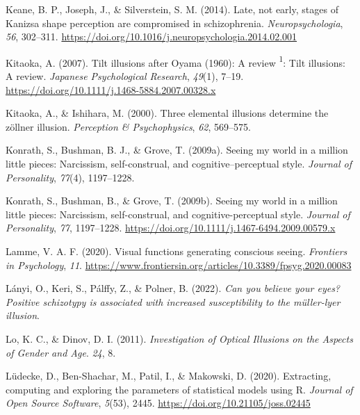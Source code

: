 \documentclass[
  man,floatsintext]{apa6}
\newlength{\cslhangindent}
\newlength{\cslentryspacingunit} %
\newenvironment{CSLReferences}[2] %
 {%
  \setlength{\parindent}{0pt}
  \ifodd #1
  \let\oldpar\par
  \def\par{\hangindent=\cslhangindent\oldpar}
  \fi
  \setlength{\parskip}{#2\cslentryspacingunit}
 }%
 {}
\begin{document}
\begin{CSLReferences}{1}{0}
\leavevmode{}%
Keane, B. P., Joseph, J., \& Silverstein, S. M. (2014). Late, not early, stages of Kanizsa shape perception are compromised in schizophrenia. \emph{Neuropsychologia}, \emph{56}, 302--311. \url{https://doi.org/10.1016/j.neuropsychologia.2014.02.001}

\leavevmode{}%
Kitaoka, A. (2007). Tilt illusions after Oyama (1960): A review {\textsuperscript{1}}: Tilt illusions: A review. \emph{Japanese Psychological Research}, \emph{49}(1), 7--19. \url{https://doi.org/10.1111/j.1468-5884.2007.00328.x}

\leavevmode{}%
Kitaoka, A., \& Ishihara, M. (2000). Three elemental illusions determine the zöllner illusion. \emph{Perception \& Psychophysics}, \emph{62}, 569--575.

\leavevmode{}%
Konrath, S., Bushman, B. J., \& Grove, T. (2009a). Seeing my world in a million little pieces: Narcissism, self-construal, and cognitive--perceptual style. \emph{Journal of Personality}, \emph{77}(4), 1197--1228.

\leavevmode{}%
Konrath, S., Bushman, B., \& Grove, T. (2009b). Seeing my world in a million little pieces: Narcissism, self-construal, and cognitive-perceptual style. \emph{Journal of Personality}, \emph{77}, 1197--1228. \url{https://doi.org/10.1111/j.1467-6494.2009.00579.x}

\leavevmode{}%
Lamme, V. A. F. (2020). Visual functions generating conscious seeing. \emph{Frontiers in Psychology}, \emph{11}. \url{https://www.frontiersin.org/articles/10.3389/fpsyg.2020.00083}

\leavevmode{}%
Lányi, O., Keri, S., Pálffy, Z., \& Polner, B. (2022). \emph{Can you believe your eyes? Positive schizotypy is associated with increased susceptibility to the m{ü}ller-lyer illusion}.

\leavevmode{}%
Lo, K. C., \& Dinov, D. I. (2011). \emph{Investigation of Optical Illusions on the Aspects of Gender and Age}. \emph{24}, 8.

\leavevmode{}%
Lüdecke, D., Ben-Shachar, M., Patil, I., \& Makowski, D. (2020). Extracting, computing and exploring the parameters of statistical models using {R}. \emph{Journal of Open Source Software}, \emph{5}(53), 2445. \url{https://doi.org/10.21105/joss.02445}


\end{CSLReferences}
\end{document}
